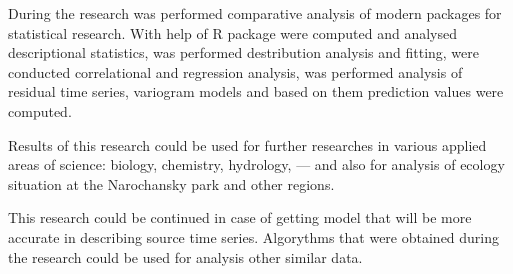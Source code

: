 During the research was performed comparative analysis of modern packages for statistical research. With help of R package were computed and analysed descriptional statistics, was performed destribution analysis and fitting, were conducted correlational and regression analysis, was performed analysis of residual time series, variogram models and based on them prediction values were computed.

Results of this research could be used for further researches in various applied areas of science: biology, chemistry, hydrology, --- and also for analysis of ecology situation at the Narochansky park and other regions.

This research could be continued in case of getting model that will be more accurate in describing source time series. Algorythms that were obtained during the research could be used for analysis other similar data.